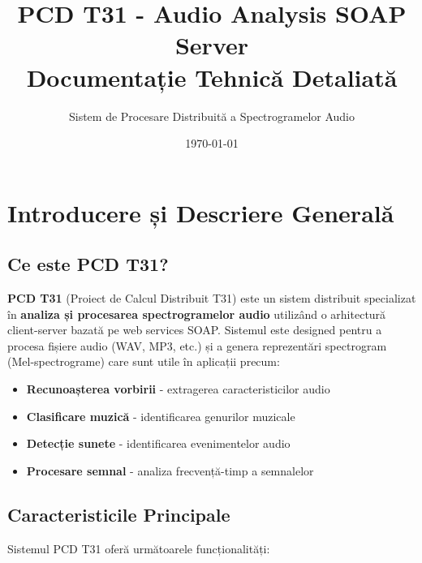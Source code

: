 \documentclass[12pt,a4paper,oneside]{book}
\title{
    \textbf{PCD T31 - Audio Analysis SOAP Server}\\
    \vspace{0.5cm}
    \large Documentație Tehnică Detaliată
}
\author{Sistem de Procesare Distribuită a Spectrogramelor Audio}
\date{\today}
\begin{document}
\maketitle

\tableofcontents
\newpage

\chapter{Introducere și Descriere Generală}

\section{Ce este PCD T31?}

\textbf{PCD T31} (Proiect de Calcul Distribuit T31) este un sistem distribuit specializat în \textbf{analiza și procesarea spectrogramelor audio} utilizând o arhitectură client-server bazată pe web services SOAP. Sistemul este designed pentru a procesa fișiere audio (WAV, MP3, etc.) și a genera reprezentări spectrogram (Mel-spectrograme) care sunt utile în aplicații precum:

\begin{itemize}
    \item \textbf{Recunoașterea vorbirii} - extragerea caracteristicilor audio
    \item \textbf{Clasificare muzică} - identificarea genurilor muzicale
    \item \textbf{Detecție sunete} - identificarea evenimentelor audio
    \item \textbf{Procesare semnal} - analiza frecvență-timp a semnalelor
\end{itemize}

\section{Caracteristicile Principale}

Sistemul PCD T31 oferă următoarele funcționalități:
\end{document}
